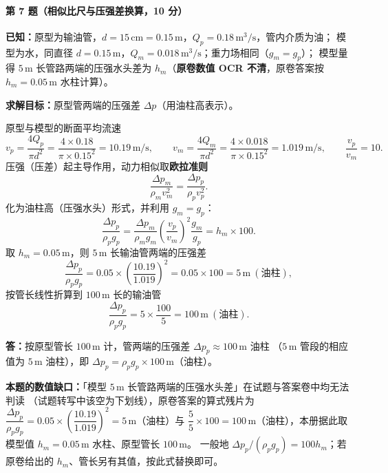 \paragraph{第 7 题（相似比尺与压强差换算，10 分）}
\begin{jie}
\textbf{已知：}原型为输油管，$d=15\,\mathrm{cm}=0.15\,\mathrm{m}$，$Q_p=0.18\,\mathrm{m^3/s}$，管内介质为油；
模型为水，同直径 $d=0.15\,\mathrm{m}$，$Q_m=0.018\,\mathrm{m^3/s}$；重力场相同（$g_m=g_p$）；
模型量得 $5\,\mathrm{m}$ 长管路两端的压强水头差为 $h_m$（\textbf{原卷数值 OCR 不清}，原卷答案按 $h_m=0.05\,\mathrm{m}$ 水柱计算）。

\textbf{求解目标：}原型管两端的压强差 $\Delta p$（用油柱高表示）。

原型与模型的断面平均流速
\[
v_p=\frac{4Q_p}{\pi d^{2}}=\frac{4\times0.18}{\pi\times0.15^{2}}=10.19\,\mathrm{m/s},
\qquad
v_m=\frac{4Q_m}{\pi d^{2}}=\frac{4\times0.018}{\pi\times0.15^{2}}=1.019\,\mathrm{m/s},
\qquad
\frac{v_p}{v_m}=10 .
\]
压强（压差）起主导作用，动力相似取\textbf{欧拉准则}
\[
\frac{\Delta p_m}{\rho_m v_m^{2}}=\frac{\Delta p_p}{\rho_p v_p^{2}} .
\]
化为油柱高（压强水头）形式，并利用 $g_m=g_p$：
\[
\frac{\Delta p_p}{\rho_p g_p}
=\frac{\Delta p_m}{\rho_m g_m}\left(\frac{v_p}{v_m}\right)^{2}\frac{g_m}{g_p}
=h_m\times100 .
\]
取 $h_m=0.05\,\mathrm{m}$，则 $5\,\mathrm{m}$ 长输油管两端的压强差
\[
\frac{\Delta p_p}{\rho_p g_p}=0.05\times\left(\frac{10.19}{1.019}\right)^{2}=0.05\times100=5\,\mathrm{m}\ (\text{油柱}),
\]
按管长线性折算到 $100\,\mathrm{m}$ 长的输油管
\[
\frac{\Delta p_p}{\rho_p g_p}=5\times\frac{100}{5}=100\,\mathrm{m}\ (\text{油柱}).
\]

\textbf{答：}按原型管长 $100\,\mathrm{m}$ 计，管两端的压强差 $\Delta p_p\approx100\,\mathrm{m}$ 油柱
（$5\,\mathrm{m}$ 管段的相应值为 $5\,\mathrm{m}$ 油柱），即 $\Delta p_p=\rho_pg_p\times100\,\mathrm{m}$（油柱）。
\end{jie}

\begin{tishi}
\textbf{本题的数值缺口：}「模型 $5\,\mathrm{m}$ 长管路两端的压强水头差」在试题与答案卷中均无法判读
（试题转写中该空为下划线），原卷答案的算式残片为
$\dfrac{\Delta p_p}{\rho_pg_p}=0.05\times\left(\dfrac{10.19}{1.019}\right)^{2}=5\,\mathrm{m}$（油柱）与
$\dfrac55\times100=100\,\mathrm{m}$（油柱），本册据此取模型值 $h_m=0.05\,\mathrm{m}$ 水柱、原型管长 $100\,\mathrm{m}$。
一般地 $\Delta p_p/(\rho_pg_p)=100h_m$；若原卷给出的 $h_m$、管长另有其值，按此式替换即可。
\end{tishi}

